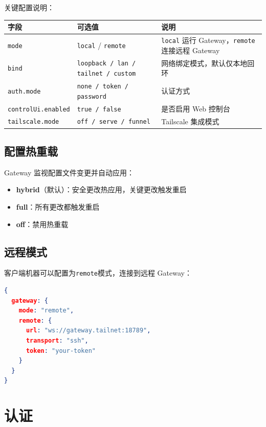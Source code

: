 \noindent 关键配置说明：

\begin{center}
\small
\begin{tabular}{llp{5cm}}
\toprule
\textbf{字段} & \textbf{可选值} & \textbf{说明} \\
\midrule
\texttt{mode} & \texttt{local} / \texttt{remote} & \texttt{local} 运行 Gateway，\texttt{remote} 连接远程 Gateway \\
\texttt{bind} & \texttt{loopback / lan / tailnet / custom} & 网络绑定模式，默认仅本地回环 \\
\texttt{auth.mode} & \texttt{none / token / password} & 认证方式 \\
\texttt{controlUi.enabled} & \texttt{true / false} & 是否启用 Web 控制台 \\
\texttt{tailscale.mode} & \texttt{off / serve / funnel} & Tailscale 集成模式 \\
\bottomrule
\end{tabular}
\end{center}

\subsection{配置热重载}

Gateway 监视配置文件变更并自动应用：

\begin{itemize}
  \item \textbf{hybrid}（默认）：安全更改热应用，关键更改触发重启
  \item \textbf{full}：所有更改都触发重启
  \item \textbf{off}：禁用热重载
\end{itemize}

\subsection{远程模式}

客户端机器可以配置为\texttt{remote}模式，连接到远程 Gateway：

\begin{lstlisting}[language=json]
{
  gateway: {
    mode: "remote",
    remote: {
      url: "ws://gateway.tailnet:18789",
      transport: "ssh",
      token: "your-token"
    }
  }
}
\end{lstlisting}

\section{认证}

